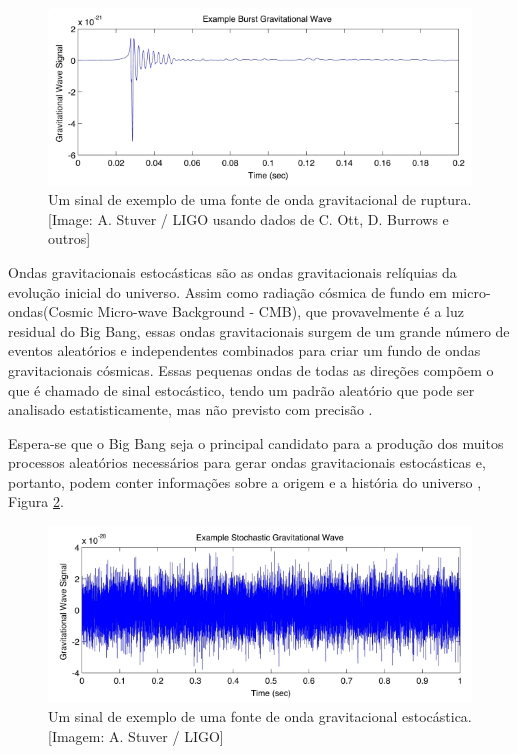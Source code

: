 \begin{figure}[ht]
\centering
\includegraphics[width=.9\textwidth]{figuras/burst_tn.jpg}
\caption{Um sinal de exemplo de uma fonte de onda gravitacional de ruptura. [Image: A. Stuver / LIGO usando dados de C. Ott, D. Burrows e outros]}
\label{figondaruptura}
\end{figure}

Ondas gravitacionais estocásticas são as ondas gravitacionais relíquias da evolução inicial do universo. Assim como radiação cósmica de fundo em micro-ondas(Cosmic Micro-wave Background - CMB), que provavelmente é a luz residual do Big Bang, essas ondas gravitacionais surgem de um grande número de eventos aleatórios e independentes combinados para criar um fundo de ondas gravitacionais cósmicas. Essas pequenas ondas de todas as direções compõem o que é chamado de sinal estocástico, tendo um padrão aleatório que pode ser analisado estatisticamente, mas não previsto com precisão \cite{Christensen_2018}.

Espera-se que o Big Bang seja o principal candidato para a produção dos muitos processos aleatórios necessários para gerar ondas gravitacionais estocásticas e, portanto, podem conter informações sobre a origem e a história do universo \cite{Christensen_2018}, Figura \ref{figondaestocastica}.

\begin{figure}[ht]
\centering
\includegraphics[width=.9\textwidth]{figuras/stochastic_tn.jpg}
\caption{Um sinal de exemplo de uma fonte de onda gravitacional estocástica. [Imagem: A. Stuver / LIGO]}
\label{figondaestocastica}
\end{figure}


